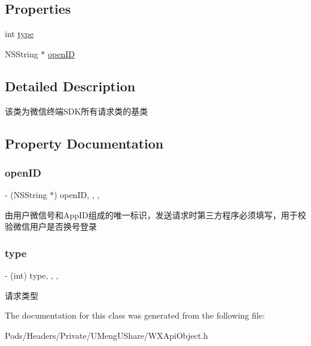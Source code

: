 \subsection*{Properties}
\begin{DoxyCompactItemize}
\item 
int \mbox{\hyperlink{interface_base_req_ac580cc5b936096c3d3172bcff0acdd6b}{type}}
\item 
N\+S\+String $\ast$ \mbox{\hyperlink{interface_base_req_ab723f631bb2074ad0ca9f1487a364fc1}{open\+ID}}
\end{DoxyCompactItemize}


\subsection{Detailed Description}
该类为微信终端\+S\+D\+K所有请求类的基类 



\subsection{Property Documentation}
\mbox{\label{interface_base_req_ab723f631bb2074ad0ca9f1487a364fc1}} 
\subsubsection{\texorpdfstring{open\+ID}{openID}}
{\footnotesize\ttfamily -\/ (N\+S\+String $\ast$) open\+ID\hspace{0.3cm}{\ttfamily [read]}, {\ttfamily [write]}, {\ttfamily [nonatomic]}, {\ttfamily [retain]}}

由用户微信号和\+App\+I\+D组成的唯一标识，发送请求时第三方程序必须填写，用于校验微信用户是否换号登录 \mbox{\label{interface_base_req_ac580cc5b936096c3d3172bcff0acdd6b}} 
\subsubsection{\texorpdfstring{type}{type}}
{\footnotesize\ttfamily -\/ (int) type\hspace{0.3cm}{\ttfamily [read]}, {\ttfamily [write]}, {\ttfamily [nonatomic]}, {\ttfamily [assign]}}

请求类型 

The documentation for this class was generated from the following file\+:\begin{DoxyCompactItemize}
\item 
Pods/\+Headers/\+Private/\+U\+Meng\+U\+Share/W\+X\+Api\+Object.\+h\end{DoxyCompactItemize}

